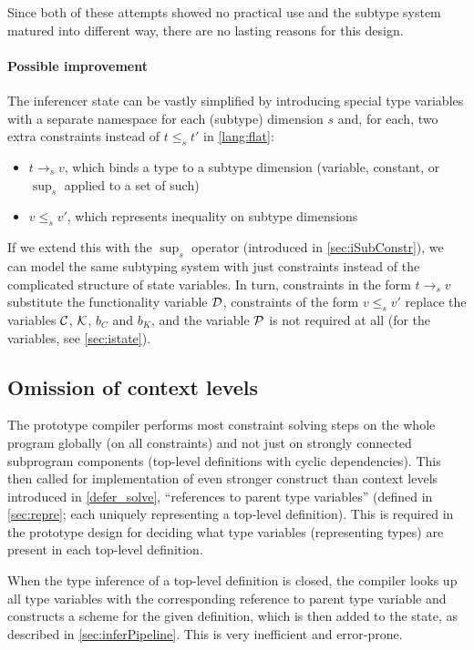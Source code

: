 Since both of these attempts showed no practical use and the subtype system matured into different way, there are no lasting reasons for this design.

\paragraph{Possible improvement} The inferencer state can be vastly simplified by introducing special type variables with a separate namespace for each (subtype) dimension $s$ and, for each, two extra constraints instead of $t \leq_s t'$ in \cref{lang:flat}:

\begin{itemize}
    \item $t \to_s v$, which binds a type to a subtype dimension (variable, constant, or $\sup_s$ applied to a set of such)
    \item $v \leq_s v'$, which represents inequality on subtype dimensions
\end{itemize}

If we extend this with the $\sup_s$ operator (introduced in \cref{sec:iSubConstr}), we can model the same subtyping system with just constraints instead of the complicated structure of state variables. In turn, constraints in the form $t \to_s v$ substitute the functionality variable $\mathcal D$, constraints of the form $v \leq_s v'$ replace the variables $\mathcal C$, $\mathcal K$, $b_C$ and $b_K$, and the variable $\mathcal P$ is not required at all (for the variables, see \cref{sec:istate}).

\subsection{Omission of context levels}
\label{sec:global}

The prototype compiler performs most constraint solving steps on the whole program globally (on all constraints) and not just on strongly connected subprogram components (top-level definitions with cyclic dependencies). This then called for implementation of even stronger construct than context levels introduced in \cref{defer_solve}, ``references to parent type variables'' (defined in \cref{sec:repre}; each uniquely representing a top-level definition). This is required in the prototype design for deciding what type variables (representing types) are present in each top-level definition.

When the type inference of a top-level definition is closed, the compiler looks up all type variables with the corresponding reference to parent type variable and constructs a scheme for the given definition, which is then added to the state, as described in \cref{sec:inferPipeline}. This is very inefficient and error-prone.

